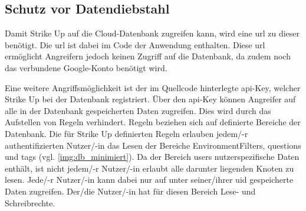 \subsection{Schutz vor Datendiebstahl}
\label{subsec:datendiebstahl}

Damit Strike Up auf die Cloud-Datenbank zugreifen kann, wird eine \gls{url} zu dieser benötigt. Die \gls{url} ist dabei im Code der Anwendung enthalten. \newline
Diese \gls{url} ermöglicht Angreifern jedoch keinen Zugriff auf die Datenbank, da zudem noch das verbundene Google-Konto benötigt wird.

Eine weitere Angriffsmöglichkeit ist der im Quellcode hinterlegte \gls{api}-Key, welcher Strike Up bei der Datenbank registriert. Über den \gls{api}-Key können Angreifer auf alle in der
Datenbank gespeicherten Daten zugreifen. \newline
Dies wird durch das Aufstellen von Regeln verhindert. Regeln beziehen sich auf definierte Bereiche der Datenbank. Die für Strike Up definierten Regeln erlauben
jedem/-r authentifizierten Nutzer/-in das Lesen der Bereiche \glqq{}EnvironmentFilters\grqq{}, \glqq{}questions\grqq{} und \glqq{}tags\grqq{} (vgl. \ref{img:db_minimiert}). \newline
Da der Bereich \glqq{}users\grqq{} nutzerspezifische Daten enthält, ist nicht jedem/-r Nutzer/-in erlaubt alle darunter liegenden Knoten zu lesen. Jede/-r Nutzer/-in kann dabei nur auf
\glqq{}unter\grqq{} seiner/ihrer \gls{uid} gespeicherte Daten zugreifen. Der/die Nutzer/-in hat für diesen Bereich Lese- und Schreibrechte.
